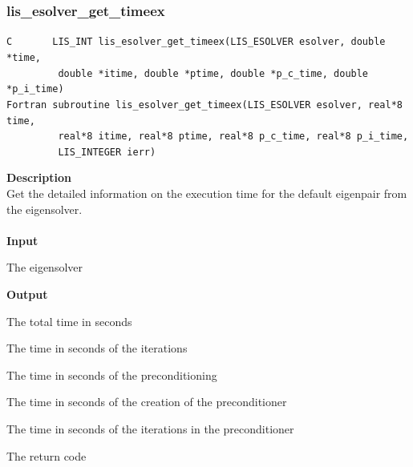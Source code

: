 \documentclass[a4paper]{article}
\newcommand{\namelistlabel}[1]{\mbox{#1}\hfill}
\newenvironment{namelist}[1]{%
\begin{list}{}
  {\let\makelabel\namelistlabel
  \settowidth{\labelwidth}{#1}
  \setlength{\leftmargin}{1.1\labelwidth}}
  }{%
\end{list}}
\begin{document}
\newpage
\subsubsection{lis\_esolver\_get\_timeex}
\begin{screen}
\verb|C       LIS_INT lis_esolver_get_timeex(LIS_ESOLVER esolver, double *time,|\\
\verb|         double *itime, double *ptime, double *p_c_time, double *p_i_time)|\\
\verb|Fortran subroutine lis_esolver_get_timeex(LIS_ESOLVER esolver, real*8 time,|\\
\verb|         real*8 itime, real*8 ptime, real*8 p_c_time, real*8 p_i_time,|\\
\verb|         LIS_INTEGER ierr)|
\end{screen}
{\bf Description}\\
\indent
Get the detailed information on the execution time for the default eigenpair from the eigensolver.
\\ \\
\noindent
{\bf Input}
\begin{namelist}{XXXXXXXXXXXXXXXXXXXX}
\item[\tt esolver] The eigensolver
\end{namelist}
{\bf Output}
\begin{namelist}{XXXXXXXXXXXXXXXXXXXX}
\item[\tt time] The total time in seconds
\item[\tt itime] The time in seconds of the iterations
\item[\tt ptime] The time in seconds of the preconditioning
\item[\tt p\_c\_time] The time in seconds of the creation of the preconditioner
\item[\tt p\_i\_time] The time in seconds of the iterations in the preconditioner
\item[\tt ierr] The return code
\end{namelist}
\end{document}
